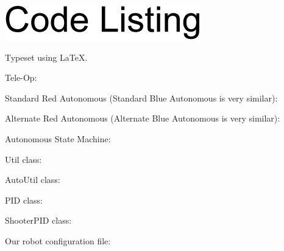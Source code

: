 \documentclass[letterpaper,10pt]{article}
\newcommand{\latex}{\LaTeX}
\begin{document}
\begin{flushleft}

\includegraphics{./CodeListingArial14.png}

\medskip

Typeset using \latex.

\medskip

Tele-Op:



\pagebreak

Standard Red Autonomous (Standard Blue Autonomous is very similar):



\pagebreak

Alternate Red Autonomous (Alternate Blue Autonomous is very similar):



\pagebreak

Autonomous State Machine:



\pagebreak

Util class:



\pagebreak

AutoUtil class:





%

\pagebreak

PID class:



\pagebreak

ShooterPID class:



\pagebreak

Our robot configuration file:



\end{flushleft}
\end{document}
